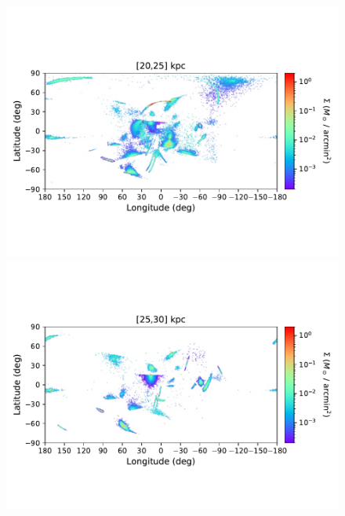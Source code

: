 \begin{figure}[h!]
\begin{center}
            \includegraphics[clip=true, trim = 0mm 20mm 0mm 20mm, width=0.9\columnwidth]{images/PII_ensemble_LB_D20-25_mass_est_new.pdf}
            \includegraphics[clip=true, trim = 0mm 20mm 0mm 20mm, width=0.9\columnwidth]{images/PII_ensemble_LB_D25-30_mass_est_new.pdf}



\end{center}
\end{figure}
